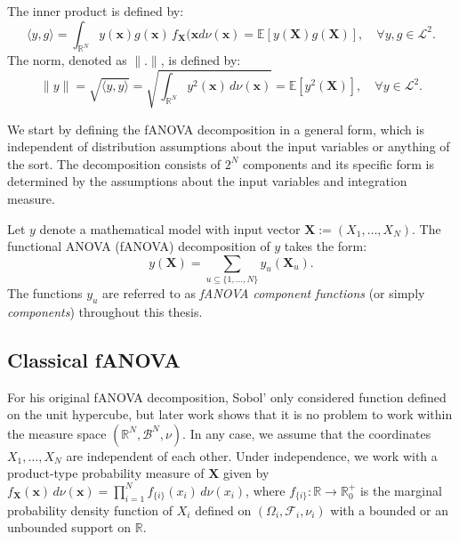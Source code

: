 The inner product is defined by:
\[
\langle y, g \rangle = \int_{\mathbb{R}^N} y(\boldsymbol{x}) g(\boldsymbol{x}) \, f_{\boldsymbol{X}}(\boldsymbol{x}d\nu(\boldsymbol{x}) = \mathbb{E}[y(\boldsymbol{X})g(\boldsymbol{X})], \quad \forall y,g \in \mathcal{L}^2.
\]
The norm, denoted as $\|.\|$, is defined by:
\[
\|y\| = \sqrt{\langle y, y \rangle} = \sqrt{\int_{\mathbb{R}^N} y^2(\boldsymbol{x}) \, d\nu(\boldsymbol{x})} = \mathbb{E}[y^2(\boldsymbol{X})], \quad \forall y \in \mathcal{L}^2.
\]

We start by defining the fANOVA decomposition in a general form, which is independent of distribution assumptions about the input variables or anything of the sort. The decomposition consists of $2^N$ components and its specific form is determined by the assumptions about the input variables and integration measure.

\begin{definition}\label{def:fanova_decomposition}
Let $y$ denote a mathematical model with input vector $\boldsymbol{X} := (X_1, \dots, X_N)$. 
The functional ANOVA (fANOVA) decomposition of $y$ takes the form:
\begin{equation}
    y(\boldsymbol{X}) = \sum_{u \subseteq \{1, \dots, N\}} y_{u}(\boldsymbol{X}_u).
\end{equation}
The functions $y_u$ are referred to as \emph{fANOVA component functions} 
(or simply \emph{components}) throughout this thesis.
\end{definition}



\subsection{Classical fANOVA}
For his original fANOVA decomposition, Sobol' only considered function defined on the unit hypercube, but later work shows that it is no problem to work within the measure space $(\mathbb{R}^N, \mathcal{B}^N, \nu)$.
In any case, we assume that the coordinates $X_1, \dots , X_N$ are independent of each other.
Under independence, we work with a product-type probability measure of $\boldsymbol{X}$ given by \(f_{\boldsymbol{X}}(\boldsymbol{x}) \, d\nu(\boldsymbol{x}) = \prod_{i=1}^{N} f_{\{i\}}(x_i) \, d\nu(x_i)\), where \(f_{\{i\}}: \mathbb{R} \rightarrow \mathbb{R}_{0}^{+}\) is the marginal probability density function of \(X_i\) defined on $(\Omega_i, \mathcal{F}_i, \nu_i)$ with a bounded or an unbounded support on $\mathbb{R}$.

